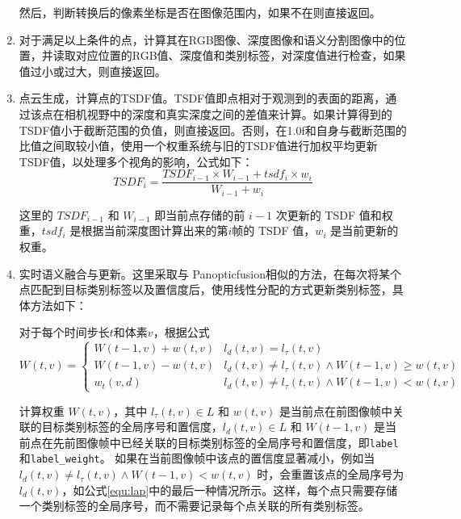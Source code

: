 \begin{enumerate}
	      然后，判断转换后的像素坐标是否在图像范围内，如果不在则直接返回。

	\item 对于满足以上条件的点，计算其在RGB图像、深度图像和语义分割图像中的位置，并读取对应位置的RGB值、深度值和类别标签，对深度值进行检查，如果值过小或过大，则直接返回。

	\item 点云生成，计算点的TSDF值。TSDF值即点相对于观测到的表面的距离，通过该点在相机视野中的深度和真实深度之间的差值来计算。如果计算得到的TSDF值小于截断范围的负值，则直接返回。否则，在1.0f和自身与截断范围的比值之间取较小值，使用一个权重系统与旧的TSDF值进行加权平均更新TSDF值，以处理多个视角的影响，公式如下：
	      \begin{equation}
		      TSDF_{i} = \frac{TSDF_{i-1} \times W_{i-1} + tsdf_{i} \times w_{i}}{W_{i-1} + w_{i}}
	      \end{equation}

	      \par 这里的 $TSDF_{i-1}$ 和 $W_{i-1}$ 即当前点存储的前 $i-1$ 次更新的 TSDF 值和权重，$tsdf_{i}$ 是根据当前深度图计算出来的第$i$帧的 TSDF 值，$w_{i}$ 是当前更新的权重。

	\item 实时语义融合与更新。这里采取与 Panopticfusion相似的方法，在每次将某个点匹配到目标类别标签以及置信度后，使用线性分配的方式更新类别标签\cite{panopticfusion,VolumetricMethod}，具体方法如下：

	      \par 对于每个时间步长$t$和体素$v$，根据公式
	      \begin{equation}
		      W(t, v)=\left\{\begin{array}{ll}
			      W(t-1, v)+w(t, v) & l_{d}(t, v)=l_{\tau}(t, v)                                    \\
			      W(t-1, v)-w(t, v) & l_{d}(t, v) \neq l_{\tau}(t, v) \wedge W(t-1, v) \geq w(t, v) \\
			      w_{t}(v, d)       & l_{d}(t, v) \neq l_{\tau}(t, v) \wedge W(t-1, v)<w(t, v)
		      \end{array}\right.
		      \label{equ:lap}
	      \end{equation}

	      计算权重 $W(t, v)$，其中 $l_{\tau}(t, v) \in L$ 和 $w(t, v)$ 是当前点在前图像帧中关联的目标类别标签的全局序号和置信度，$l_{d}(t, v) \in L$ 和 $W(t-1, v)$ 是当前点在先前图像帧中已经关联的目标类别标签的全局序号和置信度，即\texttt{label}和\texttt{label\_weight}。
	      如果在当前图像帧中该点的置信度显著减小，例如当 $l_{d}(t, v) \neq l_{\tau}(t, v) \land W(t - 1, v) < w(t, v)$ 时，会重置该点的全局序号为 $l_{d}(t, v)$，如公式\ref{equ:lap}中的最后一种情况所示。这样，每个点只需要存储一个类别标签的全局序号，而不需要记录每个点关联的所有类别标签。


\end{enumerate}
